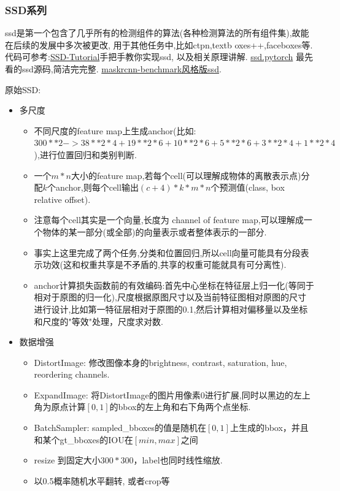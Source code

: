 \documentclass[UTF8]{ctexart}
\begin{document}
\subsubsection{SSD系列}
ssd是第一个包含了几乎所有的检测组件的算法(各种检测算法的所有组件集),故能在后续的发展中多次被更改,
用于其他任务中,比如ctpn,textb
oxes++,faceboxes等.代码可参考:\href{https://github.com/sgrvinod/a-PyTorch-Tutorial-to-Object-Detection}{SSD-Tutorial}手把手教你实现ssd,
以及相关原理讲解. \href{https://github.com/amdegroot/ssd.pytorch}{ssd.pytorch} 
最先看的ssd源码,简洁完完整.
\href{https://github.com/lufficc/SSD}{maskrcnn-benchmark风格版ssd}.

原始SSD:

\begin{itemize}
	\item 多尺度
	\begin{itemize}
		\item 不同尺度的feature map上生成anchor(比如:$300**2-> 38**2*4+19**2*6+10**2*6+5**2*6+3**2*4+1**2*4$),进行位置回归和类别判断.
		\item 一个$m*n$大小的feature map,若每个cell(可以理解成物体的离散表示点)分配$k$个anchor,则每个cell输出$(c+4)*k*m*n$个预测值(class, box relative offset).
		\item 注意每个cell其实是一个向量,长度为 channel of feature map,可以理解成一个物体的某一部分(或全部)的向量表示或者整体表示的一部分.
		\item 事实上这里完成了两个任务,分类和位置回归,所以cell向量可能具有分段表示功效(这和权重共享是不矛盾的,共享的权重可能就具有可分离性). 
		\item anchor计算损失函数前的有效编码:首先中心坐标在特征层上归一化(等同于相对于原图的归一化),尺度根据原图尺寸以及当前特征图相对原图的尺寸进行设计,比如第一特征层相对于原图的0.1,然后计算相对偏移量以及坐标和尺度的"等效"处理，尺度求对数.
	\end{itemize}

	\item 数据增强
	\begin{itemize}
		\item DistortImage: 修改图像本身的brightness, contrast, saturation, hue, reordering channels.
		\item ExpandImage: 将DistortImage的图片用像素0进行扩展,同时以黑边的左上角为原点计算$[0,1]$的bbox的左上角和右下角两个点坐标.
		\item BatchSampler: sampled\_bboxes的值是随机在$[0,1]$上生成的bbox，并且和某个gt\_bboxes的IOU在$[min, max]$之间
		\item resize 到固定大小$300*300$，label也同时线性缩放.
		\item 以0.5概率随机水平翻转, 或者crop等
	\end{itemize}


\end{itemize}
\end{document}
